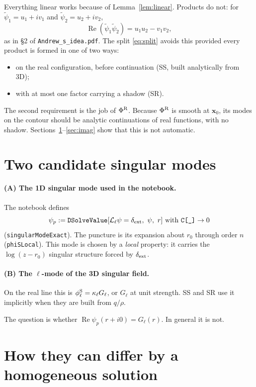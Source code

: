 \documentclass[11pt,a4paper]{article}
\renewcommand{\Re}{\operatorname{Re}}
\newcommand{\dext}{\delta_{\rm ext}}
\newcommand{\Lop}{\mathcal{L}_\ell}
\newcommand{\PhiR}{\Phi^{\rm R}}
\newcommand{\phiS}{\phi^{\rm S}}
\newcommand{\x}{\mathbf{x}}
\newcommand{\nb}[1]{\nolinkurl{#1}}
\newcommand{\code}[1]{\texttt{#1}}
\begin{document}
\medskip
Everything linear works because of Lemma~\ref{lem:linear}.
Products do not: for $\tilde\psi_1=u_1+iv_1$ and $\tilde\psi_2=u_2+iv_2$,
\begin{equation}
\Re(\tilde\psi_1\tilde\psi_2)=u_1u_2-v_1v_2,
\end{equation}
as in \S2 of \nb{Andrew_s_idea.pdf}.
The split \eqref{eq:split} avoids this provided every product is formed in one of two ways:
\begin{itemize}[nosep]
\item on the real configuration, before continuation (SS, built analytically from 3D);
\item with at most one factor carrying a shadow (SR).
\end{itemize}
The second requirement is the job of $\PhiR$.
Because $\PhiR$ is smooth at $\x_0$, its modes on the contour should be analytic continuations of real functions, with no shadow.
Sections~\ref{sec:two}--\ref{sec:imag} show that this is not automatic.

\section{Two candidate singular modes}\label{sec:two}

\paragraph{(A) The 1D singular mode used in the notebook.}
The notebook defines
\begin{equation}
\psi_p:=\code{DSolveValue}[\Lop\psi=\dext,\ \psi,\ r]\ \text{with}\ \code{C[\_]}\to0
\end{equation}
(\code{singularModeExact}).
The puncture is its expansion about $r_0$ through order $n$ (\code{phiSLocal}).
This mode is chosen by a \emph{local} property: it carries the $\log(z-r_0)$ singular structure forced by $\dext$.

\paragraph{(B) The $\ell$-mode of the 3D singular field.}
On the real line this is $\phiS_\ell=\kappa_\ell G_\ell$, or $G_\ell$ at unit strength.
SS and SR use it implicitly when they are built from $q/\rho$.

\medskip
The question is whether $\Re\psi_p(r+i0)=G_\ell(r)$.
In general it is not.

\section{How they can differ by a homogeneous solution}\label{sec:homog}
\end{document}
